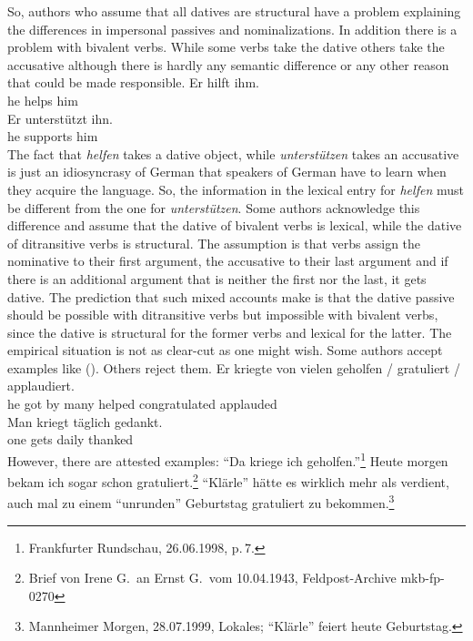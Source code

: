 So, authors who assume that all datives are structural have a problem explaining the differences in
impersonal passives and nominalizations. In addition there is a problem with bivalent verbs. While
some verbs take the dative others take the accusative although there is hardly any semantic
difference or any other reason that could be made responsible.
\eal
\ex 
\gll Er hilft ihm.\\
     he helps him\\
\ex 
\gll Er unterstützt ihn.\\
     he supports him\\
\zl
The fact that \emph{helfen} takes a dative object, while \emph{unterstützen} takes an accusative is
just an idiosyncrasy of German that speakers of German have to learn when they acquire the
language. So, the information in the lexical entry for \emph{helfen} must be different from the one
for \emph{unterstützen}. Some authors acknowledge this difference and assume that the dative of
bivalent verbs is lexical, while the dative of ditransitive verbs is structural. The assumption is
that verbs assign the nominative to their first argument, the accusative to their last argument and
if there is an additional argument that is neither the first nor the last, it gets dative. The
prediction that such mixed accounts make is that the dative passive should be possible with
ditransitive verbs but impossible with bivalent verbs, since the dative is structural for the former
verbs and lexical for the latter. The empirical situation is not as clear-cut as one might
wish. Some authors accept examples like (). Others reject them.
\eal
\ex 
\gll Er kriegte von vielen geholfen / gratuliert / applaudiert.\\
     he got by many helped {} congratulated {} applauded\\
\ex 
\gll Man kriegt täglich gedankt.\\
     one gets   daily thanked\\
\zl
However, there are attested examples:
\eal
\ex "`Da kriege ich geholfen."'\footnote{
Frankfurter Rundschau, 26.06.1998, p.\,7.%
}
\ex
Heute morgen bekam ich sogar schon gratuliert.\footnote{%
Brief von Irene G.\ an Ernst G.\ vom 10.04.1943, Feldpost-Archive mkb-fp-0270}
\ex
"`Klärle"' hätte es wirklich mehr als verdient, auch mal zu einem "`unrunden"' Geburtstag gratuliert zu bekommen.\footnote{
Mannheimer Morgen, 28.07.1999, Lokales; "`Klärle"' feiert heute Geburtstag.%
}
